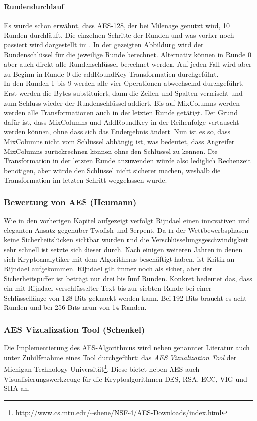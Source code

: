   \paragraph{Rundendurchlauf}
  Es wurde schon erwähnt, dass AES-128, der bei Milenage genutzt wird, 10 Runden durchläuft. Die einzelnen Schritte
  der Runden und was vorher noch passiert wird dargestellt im . In der gezeigten Abbildung
  wird der Rundenschlüssel für die jeweilige Runde berechnet. Alternativ können in Runde 0 aber auch direkt alle
  Rundenschlüssel berechnet werden. Auf jeden Fall wird aber zu Beginn in Runde 0 die addRoundKey-Transformation
  durchgeführt. \\
  In den Runden 1 bis 9 werden alle vier Operationen abwechselnd durchgeführt. Erst werden die Bytes substituiert, dann
  die Zeilen und Spalten vermischt und zum Schluss wieder der Rundenschlüssel addiert. Bis auf MixColumns werden werden
  alle Transformationen auch in der letzten Runde getätigt. Der Grund dafür ist, dass MixColumns und AddRoundKey in
  der Reihenfolge vertauscht werden können, ohne dass sich das Endergebnis ändert. Nun ist es so, dass MixColumns
  nicht vom Schlüssel abhängig ist, was bedeutet, dass Angreifer MixColumns zurückrechnen können ohne den Schlüssel
  zu kennen. Die Transformation in der letzten Runde anzuwenden würde also lediglich Rechenzeit benötigen, aber würde
  den Schlüssel nicht sicherer machen, weshalb die Transformation im letzten Schritt weggelassen wurde. \cite{schmeh07}
  
  \subsubsection{Bewertung von AES (Heumann)}
  Wie in den vorherigen Kapitel aufgezeigt verfolgt Rijndael einen innovativen und eleganten Ansatz gegenüber Twofish und
  Serpent. Da in der Wettbewerbsphasen keine Sicherheitslücken sichtbar wurden und die Verschlüsselungsgeschwindigkeit
  sehr schnell ist setzte sich dieser durch. Nach einigen weiteren Jahren in denen sich Kryptoanalytiker mit dem Algorithmus
  beschäftigt haben, ist Kritik an Rijndael aufgekommen. Rijndael gilt immer noch als sicher, aber der Sicherheitspuffer ist beträgt
  nur drei bis fünf Runden. Konkret bedeutet das, dass ein mit Rijndael verschlüsselter Text bis zur siebten Runde bei einer
  Schlüssellänge von 128 Bits geknackt werden kann. Bei 192 Bits braucht es acht Runden und bei 256 Bits neun von 14 Runden.
  
   \subsubsection{AES Vizualization Tool (Schenkel)}
   \label{subsubsec:aesviz}
   Die Implementierung des AES-Algorithmus wird neben genannter Literatur auch unter
   Zuhilfenahme eines Tool durchgeführt: das \textit{AES Vizualization Tool} der Michigan
   Technology Universität\footnote{\url{http://www.cs.mtu.edu/~shene/NSF-4/AES-Downloads/index.html}}.
   Diese bietet neben AES auch Visualisierungswerkzeuge für die Kryptoalgorithmen DES, RSA, ECC, VIG
   und SHA an.

